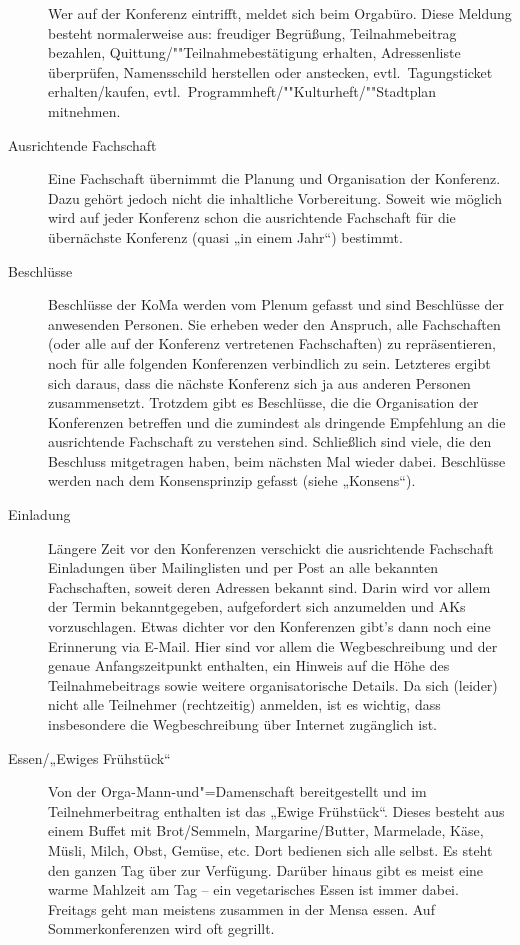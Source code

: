 \begin{description}
	Wer auf der Konferenz eintrifft, meldet sich beim Orgabüro.  Diese Meldung
	besteht normalerweise aus: freudiger Begrüßung, Teilnahmebeitrag bezahlen,
	Quittung/""Teilnahmebestätigung erhalten, Adressenliste überprüfen, Namensschild
	herstellen oder anstecken, evtl.\ Tagungsticket erhalten/kaufen, evtl.\
	Programmheft/""Kulturheft/""Stadtplan mitnehmen.

\item[Ausrichtende Fachschaft] Eine Fachschaft übernimmt die Planung und
	Organisation der Konferenz. Dazu gehört jedoch nicht die inhaltliche
	Vorbereitung. Soweit wie möglich wird auf jeder Konferenz schon die
	ausrichtende Fachschaft für die übernächste Konferenz (quasi „in einem
	Jahr“) bestimmt.

\item[Beschlüsse] Beschlüsse der KoMa werden vom Plenum gefasst und sind
	Beschlüsse der anwesenden Personen. Sie erheben weder den Anspruch, alle
	Fachschaften (oder alle auf der Konferenz vertretenen Fachschaften) zu
	repräsentieren, noch für alle folgenden Konferenzen verbindlich zu sein.
	Letzteres ergibt sich daraus, dass die nächste Konferenz sich ja aus
	anderen Personen zusammensetzt. Trotzdem gibt es Beschlüsse, die die
	Organisation der Konferenzen betreffen und die zumindest als dringende
	Empfehlung an die ausrichtende Fachschaft zu verstehen sind. Schließlich
	sind viele, die den Beschluss mitgetragen haben, beim nächsten Mal wieder
	dabei. Beschlüsse werden nach dem Konsensprinzip gefasst (siehe „Konsens“).

\item[Einladung] Längere Zeit vor den Konferenzen verschickt die ausrichtende
	Fachschaft Einladungen über Mailinglisten und per Post an alle bekannten
	Fachschaften, soweit deren Adressen bekannt sind. Darin wird vor allem der
	Termin bekanntgegeben, aufgefordert sich anzumelden und AKs vorzuschlagen.
	Etwas dichter vor den Konferenzen gibt’s dann noch eine Erinnerung via
	E-Mail. Hier sind vor allem die Wegbeschreibung und der genaue
	Anfangszeitpunkt enthalten, ein Hinweis auf die Höhe des Teilnahmebeitrags
	sowie weitere organisatorische Details. Da sich (leider) nicht alle
	Teilnehmer (rechtzeitig) anmelden, ist es wichtig, dass insbesondere die
	Wegbeschreibung über Internet zugänglich ist.

\item[Essen/„Ewiges Frühstück“] Von der Orga-Mann-und"=Damenschaft
	bereitgestellt und im Teilnehmerbeitrag enthalten ist das „Ewige
	Frühstück“. Dieses besteht aus einem Buffet mit Brot/Semmeln,
	Margarine/Butter, Marmelade, Käse, Müsli, Milch, Obst, Gemüse, etc. Dort
	bedienen sich alle selbst. Es steht den ganzen Tag über zur Verfügung.
	Darüber hinaus gibt es meist eine warme Mahlzeit am Tag -- ein vegetarisches
	Essen ist immer dabei. Freitags geht man meistens zusammen in der Mensa
	essen. Auf Sommerkonferenzen wird oft gegrillt.


\end{description}
